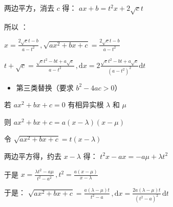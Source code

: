 两边平方，消去 $c$ 得： $ax+b=t^2x+2\sqrt{c}t$

所以 ：

$\displaystyle{x=\frac{2\sqrt{c}t-b}{a-t^2}\,,\sqrt{ax^2+bx+c}=\frac{2\sqrt{c}t-b}{a-t^2}}$

$\displaystyle{t+\sqrt{c}=\frac{\sqrt{c}t^2-bt+a\sqrt{c}}{a-t^2}\,,\mathrm{d}x=2\frac{\sqrt{c}t^2-bt+a\sqrt{c}}{(a-t^2)^2}\mathrm{d}t}$ 

\begin{itemize}
\item 第三类替换（要求 $b^2-4ac>0$）
\end{itemize}
若 $ax^2+bx+c=0$ 有相异实根 $\lambda$ 和 $\mu$

则 $ax^2+bx+c=a(x-\lambda)(x-\mu)$

令 $\sqrt{ax^2+bx+c}=t(x-\lambda)$

两边平方得，约去 $x-\lambda$ 得： $t^2x-ax=-a\mu+\lambda t^2$

于是 $\displaystyle{x=\frac{\lambda t^2-a\mu}{t^2-a^2}\,,t^2=\frac{a(x-\mu)}{x-\lambda}}$ 

于是： $\displaystyle{\sqrt{ax^2+bx+c}=\frac{a(\lambda-\mu)t}{t^2-a}\,,\mathrm{d}x=\frac{2a(\lambda-\mu)t}{(t^2-a)^2}\,\mathrm{d}t}$ 
